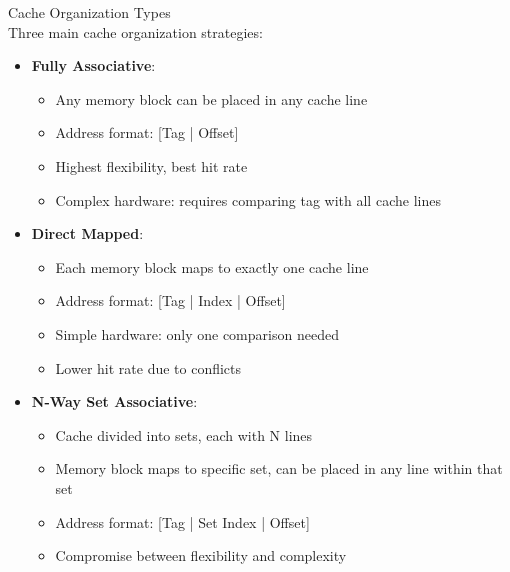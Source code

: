 \begin{definition}{Cache Organization Types}\\
Three main cache organization strategies:
\begin{itemize}
    \item \textbf{Fully Associative}:
    \begin{itemize}
        \item Any memory block can be placed in any cache line
        \item Address format: [Tag | Offset]
        \item Highest flexibility, best hit rate
        \item Complex hardware: requires comparing tag with all cache lines
    \end{itemize}
    \item \textbf{Direct Mapped}:
    \begin{itemize}
        \item Each memory block maps to exactly one cache line
        \item Address format: [Tag | Index | Offset]
        \item Simple hardware: only one comparison needed
        \item Lower hit rate due to conflicts
    \end{itemize}
    \item \textbf{N-Way Set Associative}:
    \begin{itemize}
        \item Cache divided into sets, each with N lines
        \item Memory block maps to specific set, can be placed in any line within that set
        \item Address format: [Tag | Set Index | Offset]
        \item Compromise between flexibility and complexity
    \end{itemize}
\end{itemize}
\end{definition}


